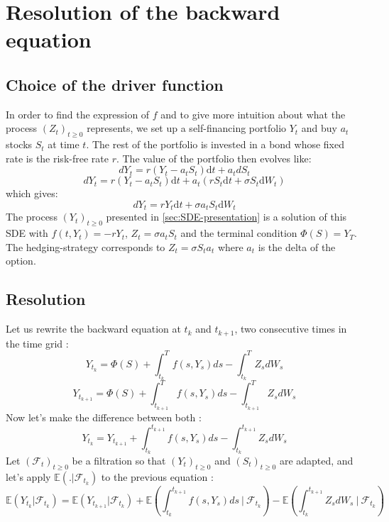\documentclass[a4paper,11pt,english]{book}
\begin{document}
\section{Resolution of the backward equation}
\subsection{Choice of the driver function}
\label{subsec:choice-of-f}
In order to find the expression of $f$ and to give more intuition about what the process $(Z_{t})_{t\geq0}$ represents, we set up a self-financing portfolio $Y_{t}$ and buy $a_{t}$ stocks $S_{t}$ at time $t$. The rest of the portfolio is invested in a bond whose fixed rate is the risk-free rate $r$. The value of the portfolio then evolves like:
$$dY_{t} = r(Y_{t}-a_{t}S_{t})\text{d}t + a_{t}dS_{t}$$
$$dY_{t} = r(Y_{t}-a_{t}S_{t})\text{d}t + a_{t}(rS_{t}\text{d}t+\sigma S_{t}\text{d}W_{t})$$
which gives:
$$dY_{t} = rY_{t}\text{d}t + \sigma a_{t}S_{t}\text{d}W_{t}$$
The process $(Y_{t})_{t\geq0}$ presented in \ref{sec:SDE-presentation} is a solution of this SDE with $f(t,Y_{t})=-rY_{t}$, $Z_{t} = \sigma a_{t}S_{t}$ and the terminal condition $\Phi(S)=Y_{T}$.
The hedging-strategy corresponds to $Z_{t}=\sigma S_{t} a_{t}$ where $a_{t}$ is the delta of the option. 
\subsection{Resolution}
Let us rewrite the backward equation at $t_{k}$ and $t_{k+1}$, two consecutive times in the time grid :
$$Y_{t_{k}} = \Phi(S) + \int_{t_{k}}^{T} f(s,Y_{s}) ds - \int_{t_{k}}^{T} Z_{s} dW_{s}$$
$$Y_{t_{k+1}} = \Phi(S) + \int_{t_{k+1}}^{T} f(s,Y_{s}) ds - \int_{t_{k+1}}^{T} Z_{s} dW_{s}$$
Now let's make the difference between both :
\begin{equation}
    Y_{t_{k}} = Y_{t_{k+1}} + \int_{t_{k}}^{t_{k+1}} f(s,Y_{s}) ds - \int_{t_{k}}^{t_{k+1}}Z_{s} dW_{s}
    \label{eq:Y_t}
\end{equation}
Let $(\mathcal{F}_{t})_{t\geq0}$ be a filtration so that $(Y_{t})_{t\geq0}$ and $(S_{t})_{t\geq0}$ are adapted, and let's apply $\mathbb{E}(.|\mathcal{F}_{t_{k}})$ to the previous equation :
$$\mathbb{E}(Y_{t_{k}}|\mathcal{F}_{t_{k}}) = \mathbb{E}(Y_{t_{k+1}}|\mathcal{F}_{t_{k}}) + \mathbb{E}\left(\int_{t_{k}}^{t_{k+1}} f(s,Y_{s}) ds~\bigg\vert~\mathcal{F}_{t_{k}}\right) - \mathbb{E}\left(\int_{t_{k}}^{t_{k+1}}Z_{s} dW_{s}~\bigg\vert~\mathcal{F}_{t_{k}}\right)$$
\end{document}
